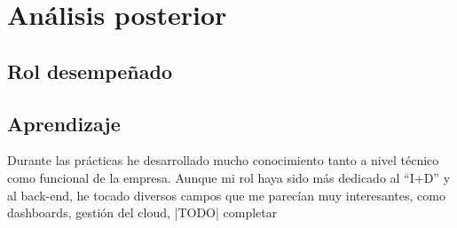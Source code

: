 \chapter{Análisis posterior}
\section{Rol desempeñado}

\section{Aprendizaje}
Durante las prácticas he desarrollado mucho conocimiento tanto a nivel técnico como
funcional de la empresa. Aunque mi rol haya sido más dedicado al “I+D” y al back-end,
he tocado diversos campos que me parecían muy interesantes, como dashboards, gestión
del cloud,
|TODO| completar

